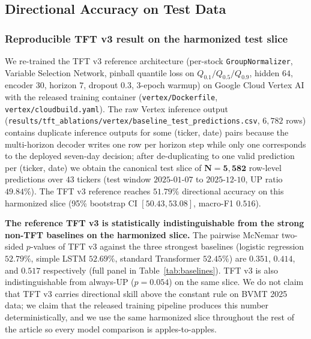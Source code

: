 \documentclass[conference]{IEEEtran}
\begin{document}
\subsection{Directional Accuracy on Test Data}\label{sec:directional_acc_on_test}

\subsubsection{Reproducible TFT v3 result on the harmonized test slice}

We re-trained the TFT v3 reference architecture (per-stock \texttt{Group\-Normalizer}, Variable Selection Network, pinball quantile loss on $Q_{0.1}/Q_{0.5}/Q_{0.9}$, hidden $64$, encoder $30$, horizon $7$, dropout $0.3$, $3$-epoch warmup) on Google Cloud Vertex AI with the released training container (\texttt{vertex/Dockerfile}, \texttt{vertex/cloudbuild.yaml}). The raw Vertex inference output (\texttt{results/tft\_ablations/vertex/baseline\_test\_predictions.csv}, $6{,}782$ rows) contains duplicate inference outputs for some (ticker, date) pairs because the multi-horizon decoder writes one row per horizon step while only one corresponds to the deployed seven-day decision; after de-duplicating to one valid prediction per (ticker, date) we obtain the canonical test slice of $\mathbf{N=5{,}582}$ row-level predictions over $43$ tickers (test window $2025\text{-}01\text{-}07$ to $2025\text{-}12\text{-}10$, UP ratio $\mathbf{49.84\%}$). The TFT v3 reference reaches $\mathbf{51.79\%}$ directional accuracy on this harmonized slice (95\% bootstrap CI $[50.43, 53.08]$, macro-F1 $0.516$).

\textbf{The reference TFT v3 is statistically indistinguishable from the strong non-TFT baselines on the harmonized slice.} The pairwise McNemar two-sided $p$-values of TFT v3 against the three strongest baselines (logistic regression $52.79\%$, simple LSTM $52.69\%$, standard Transformer $52.45\%$) are $0.351$, $0.414$, and $0.517$ respectively (full panel in Table~\ref{tab:baselines}). TFT v3 is also indistinguishable from always-UP ($p = 0.054$) on the same slice. We do not claim that TFT v3 carries directional skill above the constant rule on BVMT 2025 data; we claim that the released training pipeline produces this number deterministically, and we use the same harmonized slice throughout the rest of the article so every model comparison is apples-to-apples.
\end{document}
